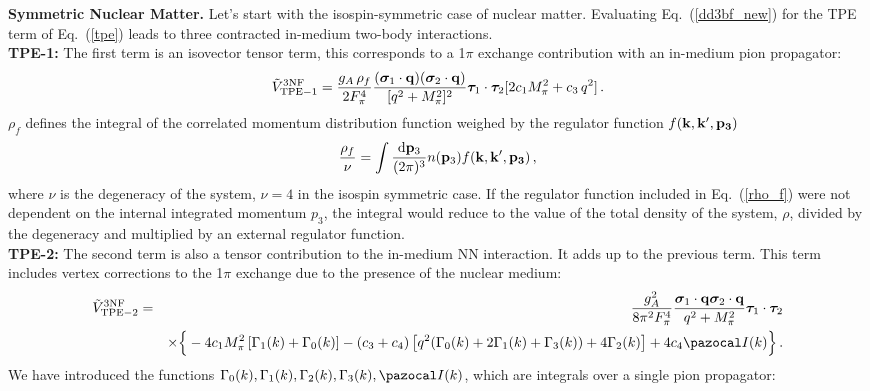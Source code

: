 {\bf Symmetric Nuclear Matter.} Let's start with the isospin-symmetric case of nuclear matter. Evaluating Eq.~(\ref{dd3bf_new}) for the TPE term of Eq.~(\ref{tpe}) leads to three contracted in-medium two-body interactions.\\ %
{\bf TPE-1:} The first term is an isovector tensor term, this corresponds to a 1$\pi$ exchange contribution with an in-medium pion propagator:
\begin{equation}
\tilde V_\mathrm{TPE-1}^\mathrm{3NF}=\frac{g_A\,\rho_f}{2 F_\pi^4}
\frac{(\boldsymbol\sigma_1\cdot{\bf q})(\boldsymbol\sigma_2\cdot{\bf q})}{[q^2 + M_\pi^2]^2}
\boldsymbol\tau_1\cdot\boldsymbol\tau_2[2 c_1M_\pi^2+ c_3\,q^2]\,.
\label{tpe_dd_1}
\end{equation}
$\rho_f$ defines the integral of the correlated momentum distribution function weighed by the regulator function $f({\bf k},{\bf k'},{\bf p_3})$
\begin{equation}
\frac{\rho_f}{\nu}=\int \frac{{\mathrm d}{\bf p}_3}{(2\pi)^3}n({\bf p}_3)f({\bf k},{\bf k'},{\bf p_3})\,,
\label{rho_f}
\end{equation}
where $\nu$ is the degeneracy of the system, $\nu=4$ in the isospin symmetric case. If the regulator function included in Eq.~(\ref{rho_f}) were not dependent on the internal integrated momentum $p_3$, the integral would reduce to the value of the total density of the system, $\rho$, divided by the degeneracy and multiplied by an external regulator function.\\ 
{\bf TPE-2:} The second term is also a tensor contribution to the in-medium NN interaction. It adds up to the previous term. %
This term includes vertex corrections to the 1$\pi$ exchange due to the presence of the nuclear medium:
\begin{eqnarray}
\tilde V_\mathrm{TPE-2}^\mathrm{3NF}&=& \frac{g_A^2}{8\pi^2F_\pi^4}
\frac{\boldsymbol\sigma_1\cdot{\bf q}\boldsymbol\sigma_2\cdot{\bf q}}{q^2 + M_\pi^2} \boldsymbol\tau_1\cdot\boldsymbol\tau_2
\\ \nonumber && 
\times
\Big\{-4c_1M_\pi^2\left[\Gamma_1(k)+\Gamma_0(k)\right]
-(c_3+c_4)\left[q^2(\Gamma_0(k)+2\Gamma_1(k)+\Gamma_3(k))+4\Gamma_2(k)\right]
+4c_4{\pazocal I}(k)\Big\}\,.
\label{tpe_dd_2}
\end{eqnarray}
We have introduced the functions $\Gamma_0(k), \Gamma_1(k), \Gamma_2(k), \Gamma_3(k), {\pazocal I}(k)$, which are integrals over a single pion propagator:
